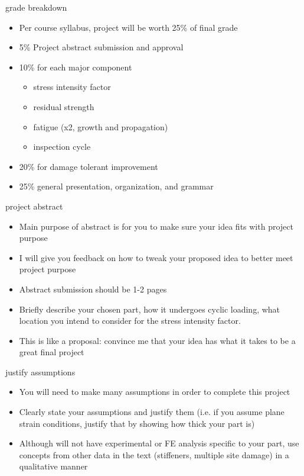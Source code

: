 \documentclass[10pt]{beamer}
\begin{document}
\begin{frame}{grade breakdown}
	\begin{itemize}[<+->]
		\item Per course syllabus, project will be worth 25\% of final grade
		\item 5\% Project abstract submission and approval
		\item 10\% for each major component
		\begin{itemize}
			\item stress intensity factor
			\item residual strength
			\item fatigue (x2, growth and propagation)
			\item inspection cycle
		\end{itemize}
		\item 20\% for damage tolerant improvement
		\item 25\% general presentation, organization, and grammar
	\end{itemize}
\end{frame}

\begin{frame}{project abstract}
	\begin{itemize}[<+->]
		\item Main purpose of abstract is for you to make sure your idea fits with project purpose
		\item I will give you feedback on how to tweak your proposed idea to better meet project purpose
		\item Abstract submission should be 1-2 pages
		\item Briefly describe your chosen part, how it undergoes cyclic loading, what location you intend to consider for the stress intensity factor.
		\item This is like a proposal: convince me that your idea has what it takes to be a great final project
	\end{itemize}
\end{frame}

\begin{frame}{justify assumptions}
	\begin{itemize}[<+->]
		\item You will need to make many assumptions in order to complete this project
		\item Clearly state your assumptions and justify them (i.e. if you assume plane strain conditions, justify that by showing how thick your part is)
		\item Although will not have experimental or FE analysis specific to your part, use concepts from other data in the text (stiffeners, multiple site damage) in a qualitative manner
	\end{itemize}
\end{frame}
\end{document}
